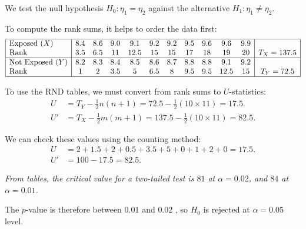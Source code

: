 \begin{solution}
We test the null hypothesis $H_0:\eta_1=\eta_2$ against the alternative $H_1:\eta_1\neq\eta_2$.

%
%

To compute the rank sums, it helps to order the data first:
\[\begin{array}{|l|cccccccccc|c|}\hline
\text{Exposed } (X)		& 8.4   	& 8.6	& 9.0	& 9.1	& 9.2	& 9.2	& 9.5	& 9.6	& 9.6	& 9.9	& 	\\
\text{Rank} 				& 3.5	& 6.5  	& 11  	& 12.5  	& 15   	& 15		& 17		& 18		& 19   	& 20		& T_X = 137.5 \\ \hline
\text{Not Exposed } (Y)	& 8.2   	& 8.3   & 8.4  	& 8.5 	& 8.6	& 8.7	& 8.8	& 8.8	& 9.1	& 9.2 	& \\ 
\text{Rank} 				& 1		& 2		& 3.5	& 5		& 6.5	& 8		& 9.5	& 9.5	& 12.5	& 15 	& T_Y = 72.5 \\ \hline
\end{array}\]

To use the RND tables, we must convert from rank sums to $U$-statistics:
\begin{align*}
U  		& =  T_Y - \frac{1}{2}n(n + 1) =  72.5 - \frac{1}{2}(10\times 11) = 17.5. \\
U' 		& =  T_X - \frac{1}{2}m(m + 1) = 137.5 - \frac{1}{2}(10\times 11) =  82.5.
\end{align*}

We can check these values using the counting method:
\begin{align*}
U  & = 2 + 1.5 + 2 + 0.5 + 3.5 + 5 + 0 + 1 + 2 + 0 = 17.5. \\
U' & = 100-17.5 = 82.5.
\end{align*}

%

\bit
\it From tables, the critical value for a two-tailed test is $81$ at $\alpha=0.02$, and $84$ at $\alpha=0.01$.
\eit

The $p$-value is therefore between $0.01$ and $0.02$ , so $H_0$ is rejected at $\alpha=0.05$ level.
\end{solution}



